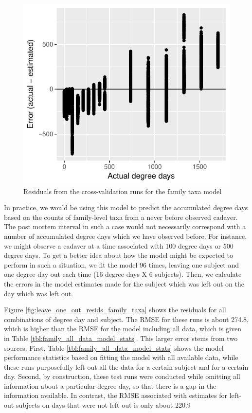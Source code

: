 \documentclass{article}
\begin{document}
\begin{figure}
  \centering
  \includegraphics{../../only_families/all_time_steps/hit_1perc_twice/orig_units_all_data_families_residuals}
  \caption{Residuals from the cross-validation runs for the family taxa model}
  \label{fig:resids_cv_family_taxa}
\end{figure}

In practice, we would be using this model to predict the accumulated
degree days based on the counts of family-level taxa from a never
before observed cadaver.  The post mortem interval in such a case
would not necessarily correspond with a number of accumulated degree
days which we have observed before.  For instance, we might observe a
cadaver at a time associated with 100 degree days or 500 degree days.
To get a better idea about how the model might be expected to perform
in such a situation, we fit the model 96 times, leaving one subject
and one degree day out each time (16 degree days X 6 subjects).  Then,
we calculate the errors in the model estimates made for the subject
which was left out on the day which was left out.

Figure \ref{fig:leave_one_out_resids_family_taxa} shows the residuals
for all combinations of degree day and subject.  The RMSE for these
runs is about 274.8, which is higher than the RMSE for the model
including all data, which is given in Table
\ref{tbl:family_all_data_model_stats}.  This larger error stems from
two sources.  First, Table \ref{tbl:family_all_data_model_stats} shows
the model performance statistics based on fitting the model with all
available data, while these runs purposefully left out all the data
for a certain subject and for a certain day.  Second, by construction,
these test runs were conducted while omitting all information about a
particular degree day, so that there is a gap in the information
available.  In contrast, the RMSE associated with estimates for
left-out subjects on days that were not left out is only about 220.9
\end{document}
